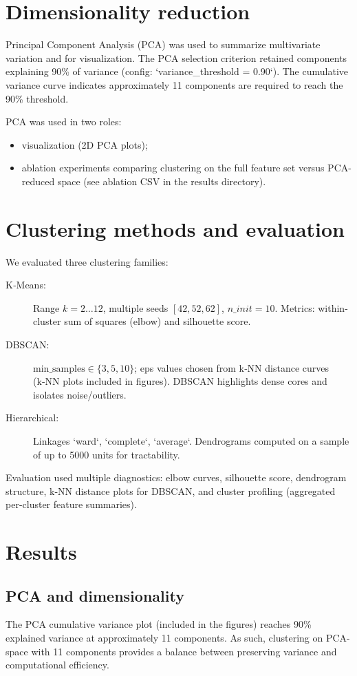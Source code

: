 \documentclass[11pt,a4paper]{article}
\begin{document}
\section{Dimensionality reduction}
Principal Component Analysis (PCA) was used to summarize multivariate variation and for visualization.
The PCA selection criterion retained components explaining 90\% of variance (config: `variance_threshold = 0.90`). The cumulative variance curve indicates approximately 11 components are required to reach the 90\% threshold.

PCA was used in two roles:
\begin{itemize}
  \item visualization (2D PCA plots);
  \item ablation experiments comparing clustering on the full feature set versus PCA-reduced space (see ablation CSV in the results directory).
\end{itemize}

\section{Clustering methods and evaluation}
We evaluated three clustering families:
\begin{description}
  \item[K‑Means:] Range $k = 2\ldots12$, multiple seeds $[42,52,62]$, $n\_init = 10$. Metrics: within-cluster sum of squares (elbow) and silhouette score.
  \item[DBSCAN:] $\mathrm{min\_samples} \in \{3,5,10\}$; eps values chosen from k‑NN distance curves (k‑NN plots included in figures). DBSCAN highlights dense cores and isolates noise/outliers.
  \item[Hierarchical:] Linkages `ward`, `complete`, `average`. Dendrograms computed on a sample of up to 5000 units for tractability.
\end{description}

Evaluation used multiple diagnostics: elbow curves, silhouette score, dendrogram structure, k‑NN distance plots for DBSCAN, and cluster profiling (aggregated per-cluster feature summaries).

\section{Results}
\subsection{PCA and dimensionality}
The PCA cumulative variance plot (included in the figures) reaches 90\% explained variance at approximately 11 components. As such, clustering on PCA-space with 11 components provides a balance between preserving variance and computational efficiency.
\end{document}
